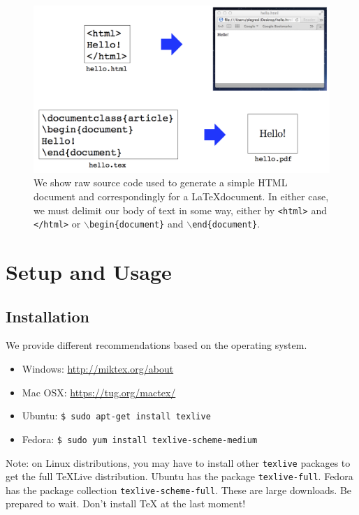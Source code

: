 \documentclass[12pt,letterpaper,twoside]{article}
\begin{document}
\begin{figure}[h]
\centering
\includegraphics[scale=0.65]{fig/markup.png}
\caption{\footnotesize We show raw source code used to generate a simple HTML
  document and correspondingly for a \LaTeX document. In either case,
  we must delimit our body of text in some way, either by
  \texttt{<html>} and \texttt{</html>} or \texttt{$\backslash$begin\{document\}}
    and \texttt{$\backslash$end\{document\}}.} 
\end{figure}

\section{Setup and Usage}

\subsection{Installation}
We provide different recommendations based on the operating system.
{
  \small
\begin{itemize}
\item
  Windows: \url{http://miktex.org/about}
\item
  Mac OSX: \url{https://tug.org/mactex/}
\item
  Ubuntu: \texttt{\$\ sudo\ apt-get\ install\ texlive}
\item
  Fedora: \texttt{\$\ sudo\ yum\ install\ texlive-scheme-medium}
\end{itemize}
}

Note: on Linux distributions, you may have to install other
\texttt{texlive} packages to get the full TeXLive distribution. Ubuntu
has the package \texttt{texlive-full}. Fedora has the package collection
\texttt{texlive-scheme-full}. These are large downloads. Be prepared to
wait. Don't install TeX at the last moment!
\end{document}
